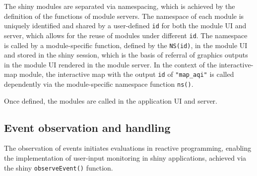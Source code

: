 \documentclass{aucklandthesis}
\begin{document}
The shiny modules are separated via namespacing, which is achieved by the definition of the functions of module servers. The namespace of each module is uniquely identified and shared by a user-defined \texttt{id} for both the module UI and server, which allows for the reuse of modules under different \texttt{id}. The namespace is called by a module-specific function, defined by the \texttt{NS(id)}, in the module UI and stored in the shiny session, which is the basis of referral of graphics outputs in the module UI rendered in the module server. In the context of the interactive-map module, the interactive map with the output \texttt{id} of \texttt{"map\_aqi"} is called dependently via the module-specific namespace function \texttt{ns()}.

Once defined, the modules are called in the application UI and server.

\begin{Shaded}
\begin{Highlighting}[]
\StringTok{ }
  \NormalTok{(}
\NormalTok{\}}

\StringTok{ }\NormalTok{(}
   \NormalTok{(}
      \NormalTok{(}\NormalTok{(}\NormalTok{(}\NormalTok{))),}
\NormalTok{    ),}
\NormalTok{  )}
\NormalTok{)}
\end{Highlighting}
\end{Shaded}

\hypertarget{sec:shiny-event}{%
\subsection{Event observation and handling}\label{sec:shiny-event}}

The observation of events initiates evaluations in reactive programming, enabling the implementation of user-input monitoring in shiny applications, achieved via the shiny \texttt{observeEvent()} function.
\end{document}
